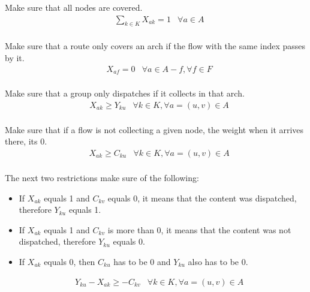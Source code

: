 Make sure that all nodes are covered. \\

\begin{align*}
        &\sum_{k \in K}{X_{ak}=1} & \forall a \in A\\
\end{align*}

Make sure that a route only covers an arch if the flow with the same index passes by it. \\

\begin{align*}
        &X_{af} = 0 & \forall a \in A - f,  \forall f \in F\\
\end{align*}

Make sure that a group only dispatches if it collects in that arch. \\

\begin{align*}
        &X_{ak} \geq Y_{ku} & \forall k \in K, \forall a = (u,v) \in A \\
\end{align*}

Make sure that if a flow is not collecting a given node, the weight when it arrives there, its 0. \\

\begin{align*}
    &X_{ak} \geq C_{ku} & \forall k \in K, \forall a = (u,v) \in A \\
\end{align*}

The next two restrictions make sure of the following: \\

\begin{itemize}
    \item If $X_{ak}$ equals 1 and $C_{kv}$ equals 0, it means that the content was dispatched, therefore $Y_{ku}$ equals 1. \\
    \item If $X_{ak}$ equals 1 and $C_{kv}$ is more than 0, it means that the content was not dispatched, therefore $Y_{ku}$ equals 0. \\ 
    \item If $X_{ak}$ equals 0, then $C_{ku}$ has to be 0 and $Y_{ku}$ also has to be 0. \\
\end{itemize}

\begin{align*}
        &Y_{ku} - X_{ak} \geq -C_{kv} & \forall k \in K, \forall a = (u,v) \in A \\
\end{align*}

